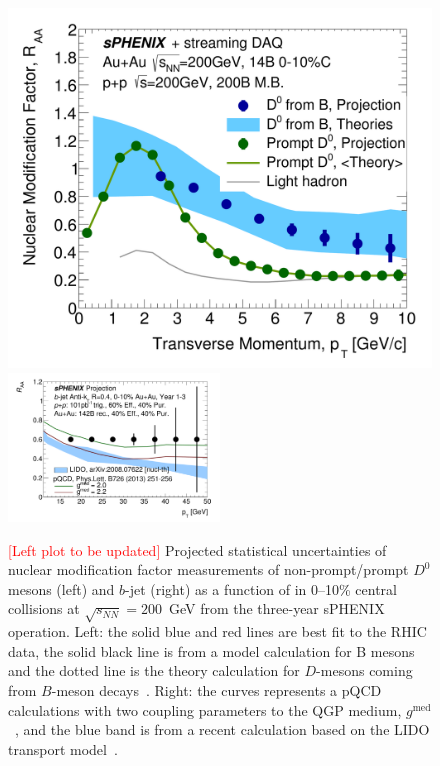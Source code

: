 \begin{figure}[htbp]
\centering
\includegraphics[width=.49\linewidth]{figs/RAA_DB_theory_root_RAADB_pp200B.pdf}
\includegraphics[width=0.5\textwidth]{figs/200pp_pythia8_CTEQ6L_7GeV_ALL_cfg_eneg_DSTReader_root_Draw_HFJetTruth_CrossSection2RAA_Theory_3yr_deta0_70.pdf}
\caption{{\textcolor{red}{[Left plot to be updated]}} Projected
  statistical uncertainties of nuclear modification factor \raa
  measurements of non-prompt/prompt $D^0$ mesons (left) and $b$-jet
  (right) as a function of \pT in 0--10\% central \auau collisions at
  $\sqrt{s_{NN}}=200$~GeV from the three-year sPHENIX operation. Left:
  the solid blue and red lines are best fit to the RHIC data, the
  solid black line is from a model calculation for B mesons and the
  dotted line is the theory calculation for $D$-mesons coming from
  $B$-meson decays~\cite{Duke,TAMU,PHSD,CUJET}. Right: the curves
  represents a pQCD calculations with two coupling parameters to the
  QGP medium, $g^{\textrm{med}}$~\cite{Huang:2013vaa}, and the blue
  band is from a recent calculation based on the LIDO transport
  model~\cite{Ke:2020nsm}. }
\label{fig:HF-inclusive-RAA}
\end{figure}

